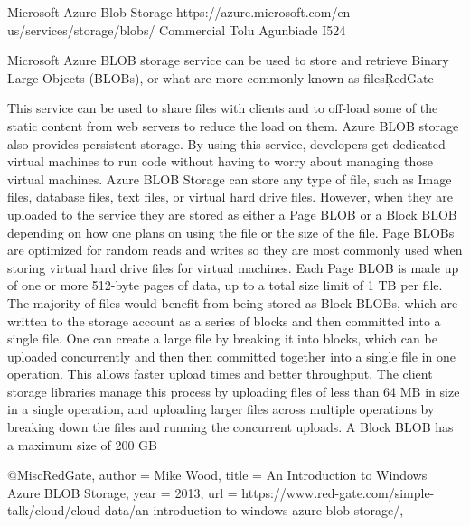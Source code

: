 Microsoft Azure Blob Storage
https://azure.microsoft.com/en-us/services/storage/blobs/ 
Commercial 
Tolu Agunbiade 
I524


Microsoft Azure BLOB storage service can be used to store and retrieve Binary
Large Objects (BLOBs), or what are more commonly known as files\c{RedGate}


This service can be used to share files with clients and to off-load some of the
static content from web servers to reduce the load on them. Azure BLOB storage
also provides persistent storage. By using this service, developers get
dedicated virtual machines to run code without having to worry about managing
those virtual machines. Azure BLOB Storage can store any type of file, such as
Image files, database files, text files, or virtual hard drive files. However,
when they are uploaded to the service they are stored as either a Page BLOB or a
Block BLOB depending on how one plans on using the file or the size of the file.
Page BLOBs are optimized for random reads and writes so they are most commonly
used when storing virtual hard drive files for virtual machines. Each Page BLOB
is made up of one or more 512-byte pages of data, up to a total size limit of 1
TB per file. The majority of files would benefit from being stored as Block
BLOBs, which are written to the storage account as a series of blocks and then
committed into a single file. One can create a large file by breaking it into
blocks, which can be uploaded concurrently and then then committed together into
a single file in one operation. This allows faster upload times and better
throughput. The client storage libraries manage this process by uploading files
of less than 64 MB in size in a single operation, and uploading larger files
across multiple operations by breaking down the files and running the concurrent
uploads. A Block BLOB has a maximum size of 200 GB\cite{RedGate}


@Misc{RedGate, 
author = {Mike Wood}, 
title = {An Introduction to Windows Azure BLOB Storage}, 
year = {2013}, 
url = {https://www.red-gate.com/simple-talk/cloud/cloud-data/an-introduction-to-windows-azure-blob-storage/},
}
